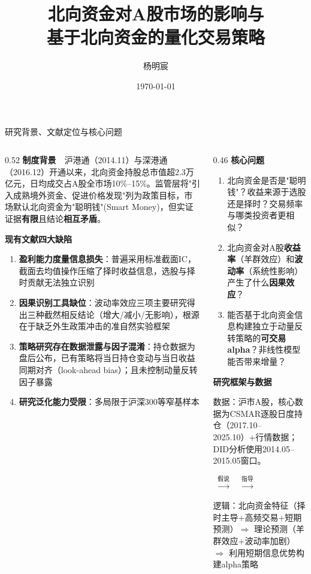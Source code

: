 \documentclass[10pt, aspectratio=169]{beamer}
\title{北向资金对A股市场的影响与\\基于北向资金的量化交易策略}
\author{杨明宸}
\institute{清华大学}
\date{\today}
\begin{document}
\begin{frame}
\titlepage
\end{frame}

\begin{frame}{研究背景、文献定位与核心问题}
\begin{columns}[T]
\begin{column}{0.52\textwidth}
\textbf{制度背景}\ \ 沪港通（2014.11）与深港通（2016.12）开通以来，北向资金持股总市值超2.3万亿元，日均成交占A股全市场10\%--15\%。监管层将"引入成熟境外资金、促进价格发现"列为政策目标，市场默认北向资金为"聪明钱"(Smart Money)，但实证证据\textbf{有限}且结论\textbf{相互矛盾}。

\vspace{0.3em}
\textbf{现有文献四大缺陷}
\begin{enumerate}\setlength\itemsep{0pt}
    \item \textbf{盈利能力度量信息损失}：普遍采用标准截面IC，截面去均值操作压缩了择时收益信息，选股与择时贡献无法独立识别
    \item \textbf{因果识别工具缺位}：波动率效应三项主要研究得出三种截然相反结论（增大/减小/无影响），根源在于缺乏外生政策冲击的准自然实验框架
    \item \textbf{策略研究存在数据泄露与因子混淆}：持仓数据为盘后公布，已有策略将当日持仓变动与当日收益同期对齐（look-ahead bias）；且未控制动量反转因子暴露
    \item \textbf{研究泛化能力受限}：多局限于沪深300等窄基样本
\end{enumerate}
\end{column}
\begin{column}{0.46\textwidth}
\textbf{核心问题}
\begin{enumerate}\setlength\itemsep{0pt}
    \item 北向资金是否是"聪明钱"？收益来源于选股还是择时？交易频率与哪类投资者更相似？
    \item 北向资金对A股\textbf{收益率}（羊群效应）和\textbf{波动率}（系统性影响）产生了什么\textbf{因果效应}？
    \item 能否基于北向资金信息构建独立于动量反转策略的\textbf{可交易alpha}？非线性模型能否带来增量？
\end{enumerate}

\vspace{0.3em}
\textbf{研究框架与数据}

数据：沪市A股，核心数据为CSMAR逐股日度持仓（2017.10--2025.10）+行情数据；DID分析使用2014.05--2015.05窗口。

\vspace{0.2em}
\centering
{} $\;\xrightarrow{\text{假说}}\;$  $\;\xrightarrow{\text{指导}}\;$ 

\vspace{0.2em}
\raggedright
{\scriptsize 逻辑：北向资金特征（择时主导+高频交易+短期预测）$\Rightarrow$ 理论预测（羊群效应+波动率加剧）$\Rightarrow$ 利用短期信息优势构建alpha策略}
\end{column}
\end{columns}
\end{frame}
\end{document}
